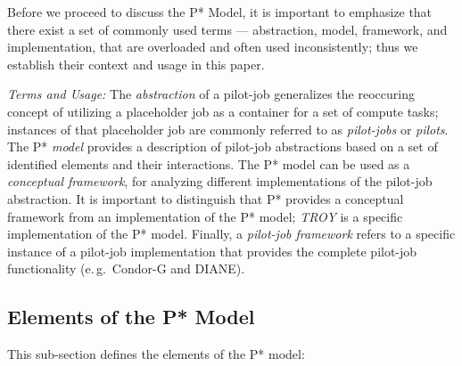 \documentclass[conference,final]{IEEEtran}
\newcommand{\jhanote}[1]{ {\textcolor{red} { ***shantenu: #1 }}}
\newcommand{\jhanote}[1]{}
\newcommand{\upp}{\vspace*{-0.5em}}
\begin{document}
Before we proceed to discuss the P* Model, it is important to
emphasize that there exist a set of commonly used terms ---
abstraction, model, framework, and implementation, that are overloaded
and often used inconsistently; thus we establish their context and
usage in this paper.

\emph{Terms and Usage:} The \emph{ abstraction} of a pilot-job
generalizes the reoccuring concept of utilizing a placeholder job as a
container for a set of compute tasks; instances of that placeholder
job are commonly referred to as \emph{pilot-jobs} or \emph{pilots}.
The P* \emph{model} provides a %
description of pilot-job abstractions based on a set of identified
elements and their interactions. The P* model can be used as a {\it
  conceptual framework}, for analyzing different implementations of
the pilot-job abstraction.  It is important to distinguish that P*
provides a conceptual framework from an implementation of the P*
model; \emph{TROY} is a specific implementation of the P* model.
Finally, a \emph{pilot-job framework} refers to a specific instance of
a pilot-job implementation that provides the complete pilot-job
functionality (e.\,g.\ Condor-G and DIANE).




%

\noindent 
\subsection{Elements of the P* Model \upp\upp}
\noindent This sub-section defines the elements of the P* model:
\end{document}
